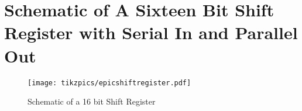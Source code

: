 \documentclass[../main]{subfiles}
\begin{document}
\clearpage

\section{Schematic of A Sixteen Bit Shift Register with Serial In and Parallel Out}

\begin{figure}[!ht]

    \centering
    \resizebox{0.9\textwidth}{!} {
        \texttt{[image: tikzpics/epicshiftregister.pdf]}
        }
        \caption{Schematic of a 16 bit Shift Register}

\end{figure}
\end{document}
